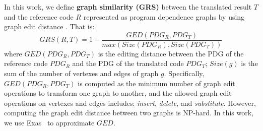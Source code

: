In this work, we define \textbf{graph similarity (GRS)} between the translated 
result $T$ and the reference code $R$ represented as program dependence graphs 
by using graph edit distance \cite{??}. That is:
$$GRS(R, T) = 1-\frac{GED(PDG_R, PDG_T)}{max\left(Size(PDG_R), Size(PDG_T)\right)}$$
where $GED(PDG_R, PDG_T)$ is the editing distance between the PDG of the 
reference code $PDG_R$ and the PDG of the translated code $PDG_T$; $Size(g)$
is the sum of the number of vertexes and edges of graph $g$. Specifically, 
$GED(PDG_R, PDG_T)$ is computed as the minimum number of graph edit operations 
to transform one graph to another, and the allowed graph edit operations on 
vertexes and edges includes: {\em insert}, {\em delete}, and {\em substitute}.
However, computing the graph edit distance between two graphs is NP-hard.
In this work, we use Exas~\cite{fase09} to approximate $GED$. 



